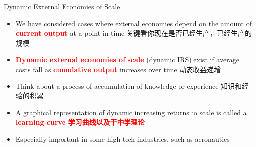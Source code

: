 \documentclass[10pt,hyperref={CJKbookmarks=true},xcolor=dvipsnames,aspectratio=169]{beamer}
\begin{document}
\begin{frame}{Dynamic External Economies of Scale}

\begin{itemize}
\item We have considered cases where external economies depend on the amount
of \textbf{\textcolor{red}{current output }}at a point in time 关键看你现在是否已经生产，已经生产的规模
\item \textbf{\textcolor{red}{Dynamic external economies of scale}} (dynamic
IRS) exist if average costs fall as \textbf{\textcolor{red}{cumulative
output}} increases over time 动态收益递增
\item Think about a process of accumulation of knowledge or experience 知识和经验的积累
\item A graphical representation of dynamic increasing returns to scale
is called a \textbf{\textcolor{red}{learning curve 学习曲线以及干中学理论 }}
\item Especially important in some high-tech industries, such as aeronautics
\end{itemize}
\end{frame}
\end{document}
